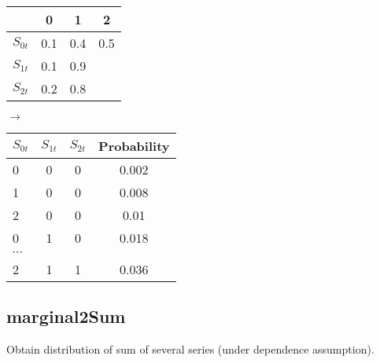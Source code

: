 \documentclass[12pt]{article}
\begin{document}
\vspace{4mm}
\begin{minipage}[t]{.3\textwidth}
    \begin{tabular}{lccc}
        \hline
            & 0 & 1 & 2\\\hline
        $S_{0t}$ & 0.1 & 0.4 & 0.5  \\
        $S_{1t}$ & 0.1 & 0.9 &   \\
        $S_{2t}$ & 0.2 & 0.8 &   \\\hline
    \end{tabular}
\end{minipage}%
\hfill
\noindent
\begin{minipage}[t]{0.1\textwidth}
    $\rightarrow$
\end{minipage}%
\hfill
\noindent
\begin{minipage}[t]{0.5\textwidth}
    \begin{tabular}{lccc}
        \hline
        $S_{0t}$  & $S_{1t}$ & $S_{2t}$ &  Probability\\\hline
        0 & 0 & 0 & 0.002 \\
        1 & 0 & 0 &  0.008 \\
        2 & 0 & 0 & 0.01 \\
        0 & 1 & 0 & 0.018 \\
        $\cdots$ \\
        2 & 1 & 1  &0.036\\ \hline

    \end{tabular}

\end{minipage}


\subsection{marginal2Sum}
\label{marginal2Sum}
Obtain distribution of sum of several series (under dependence assumption).
\end{document}
